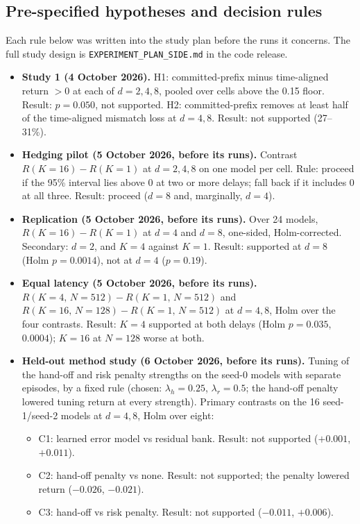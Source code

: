 \documentclass[pdflatex,sn-nature]{sn-jnl}%
\begin{document}
\subsection{Pre-specified hypotheses and decision rules}\label{app:prereg}

Each rule below was written into the study plan before the runs it concerns. The full study design is \texttt{EXPERIMENT\_PLAN\_SIDE.md} in the code release.
\begin{itemize}
\item \textbf{Study 1 (4 October 2026).} H1: committed-prefix minus time-aligned return $>0$ at each of $d=2,4,8$, pooled over cells above the 0.15 floor. Result: $p=0.050$, not supported. H2: committed-prefix removes at least half of the time-aligned mismatch loss at $d=4,8$. Result: not supported (27--31\%).
\item \textbf{Hedging pilot (5 October 2026, before its runs).} Contrast $R(K=16)-R(K=1)$ at $d=2,4,8$ on one model per cell. Rule: proceed if the 95\% interval lies above 0 at two or more delays; fall back if it includes 0 at all three. Result: proceed ($d=8$ and, marginally, $d=4$).
\item \textbf{Replication (5 October 2026, before its runs).} Over 24 models, $R(K=16)-R(K=1)$ at $d=4$ and $d=8$, one-sided, Holm-corrected. Secondary: $d=2$, and $K=4$ against $K=1$. Result: supported at $d=8$ (Holm $p=0.0014$), not at $d=4$ ($p=0.19$).
\item \textbf{Equal latency (5 October 2026, before its runs).} $R(K=4,\,N=512)-R(K=1,\,N=512)$ and $R(K=16,\,N=128)-R(K=1,\,N=512)$ at $d=4,8$, Holm over the four contrasts. Result: $K=4$ supported at both delays (Holm $p=0.035$, $0.0004$); $K=16$ at $N=128$ worse at both.
\item \textbf{Held-out method study (6 October 2026, before its runs).} Tuning of the hand-off and risk penalty strengths on the seed-0 models with separate episodes, by a fixed rule (chosen: $\lambda_h=0.25$, $\lambda_r=0.5$; the hand-off penalty lowered tuning return at every strength). Primary contrasts on the 16 seed-1/seed-2 models at $d=4,8$, Holm over eight:
\begin{itemize}
\item C1: learned error model vs residual bank. Result: not supported ($+0.001$, $+0.011$).
\item C2: hand-off penalty vs none. Result: not supported; the penalty lowered return ($-0.026$, $-0.021$).
\item C3: hand-off vs risk penalty. Result: not supported ($-0.011$, $+0.006$).

\end{itemize}
\end{itemize}
\end{document}

